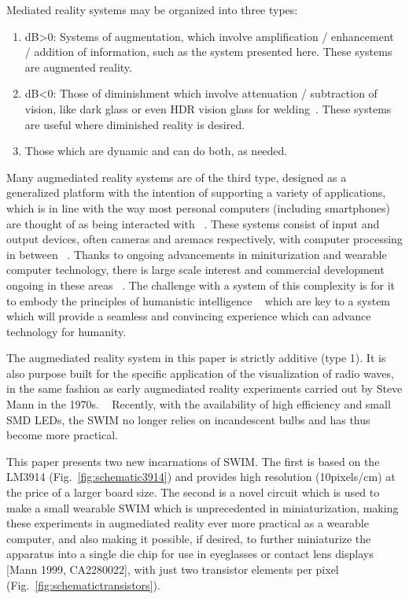 \documentclass{sigchi-ext}
\begin{document}
Mediated reality systems may be organized into three types:
\begin{enumerate}
\item dB\textgreater  0: Systems of augmentation, which involve amplification / enhancement / addition of information, such as the system presented here. These systems are augmented reality.
\item dB\textless  0: Those of diminishment which involve
attenuation / subtraction of vision, like dark glass or even
HDR vision glass for welding~\cite{mannHDR}.
These systems are useful where diminished reality is desired.
\item Those which are dynamic and can do both, as needed.
\end{enumerate}

Many augmediated reality systems are of the third type, designed as a
generalized platform with the intention of supporting a variety of
applications, which is in line with the way most personal computers (including
smartphones) are thought of as being interacted with ~\cite{arsurvey}. These
systems consist of input and output devices, often cameras and aremacs
respectively, with computer processing in between ~\cite{mann2012realtime}.
Thanks to ongoing advancements in miniturization and wearable computer
technology, there is large scale interest and commercial development ongoing in
these areas ~\cite{mann1998wearable}. The challenge with a system of this
complexity is for it to embody the principles of humanistic intelligence
~\cite{mann1998humanistic} which are key to a system which will provide a
seamless and convincing experience which can advance technology for
humanity.~\cite{mann2001wearable}

The augmediated reality system in this paper is strictly additive (type 1). It
is also purpose built for the specific application of the visualization of
radio waves, in the same fashion as early augmediated reality experiments
carried out by Steve Mann in the 1970s. ~\cite{mann2015phenomenal} Recently,
with the availability of high efficiency and small SMD LEDs, the SWIM no longer
relies on incandescent bulbs and has thus become more practical.

This paper presents two new incarnations of SWIM. The first is based on the
LM3914 (Fig.~\ref{fig:schematic3914})
and provides high resolution (10pixels/cm) at the price of a larger
board size. The second is a novel circuit which is used to make a small
wearable SWIM which is unprecedented in miniaturization,
making these experiments in augmediated reality ever more practical
as a wearable computer, and also making it possible, if desired, to
further miniaturize the apparatus into a single die chip for use in eyeglasses
or contact lens displays [Mann 1999, CA2280022],
with just two transistor elements per pixel
(Fig.~\ref{fig:schematictransistors}).
\end{document}
